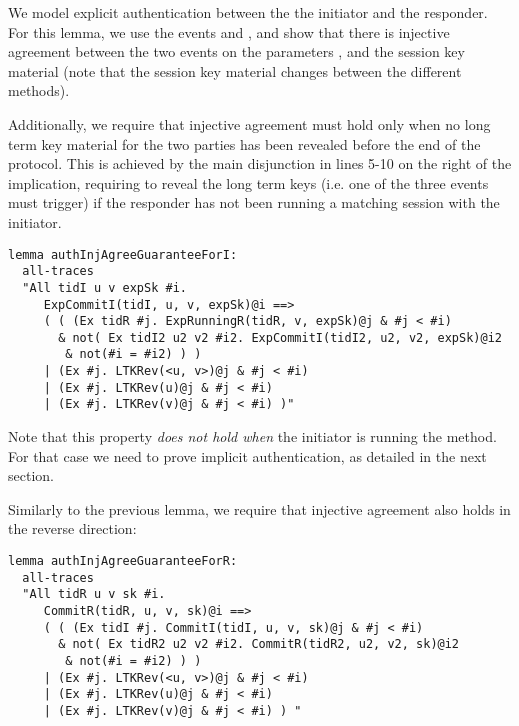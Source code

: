 We model explicit authentication between the the initiator and the
responder.
%
For this lemma, we use the events  and
, and show that there is injective agreement
between the two events on the parameters ,
 and the session key material  (note
that the session key material changes between the different \mEdhoc{}
methods).

Additionally, we require that injective agreement must hold only when
no long term key material for the two parties has been revealed before
the end of the protocol.
%
This is achieved by the main disjunction in lines 5-10 on the right of
the implication, requiring to reveal the long term keys (i.e. one of
the three  events must trigger) if the responder has
not been running a matching session with the initiator.

\begin{lstlisting}
lemma authInjAgreeGuaranteeForI:
  all-traces
  "All tidI u v expSk #i.
     ExpCommitI(tidI, u, v, expSk)@i ==>
     ( ( (Ex tidR #j. ExpRunningR(tidR, v, expSk)@j & #j < #i)
       & not( Ex tidI2 u2 v2 #i2. ExpCommitI(tidI2, u2, v2, expSk)@i2
        & not(#i = #i2) ) )
     | (Ex #j. LTKRev(<u, v>)@j & #j < #i)
     | (Ex #j. LTKRev(u)@j & #j < #i)
     | (Ex #j. LTKRev(v)@j & #j < #i) )"
\end{lstlisting}

Note that this property \emph{does not hold when} the initiator is
running the \mStat{} method.
%
For that case we need to prove implicit authentication, as detailed in
the next section.

Similarly to the previous lemma, we require that injective agreement also holds
in the reverse direction:

\begin{lstlisting}
lemma authInjAgreeGuaranteeForR:
  all-traces
  "All tidR u v sk #i.
     CommitR(tidR, u, v, sk)@i ==>
     ( ( (Ex tidI #j. CommitI(tidI, u, v, sk)@j & #j < #i)
       & not( Ex tidR2 u2 v2 #i2. CommitR(tidR2, u2, v2, sk)@i2
        & not(#i = #i2) ) )
     | (Ex #j. LTKRev(<u, v>)@j & #j < #i)
     | (Ex #j. LTKRev(u)@j & #j < #i)
     | (Ex #j. LTKRev(v)@j & #j < #i) ) "
\end{lstlisting}

